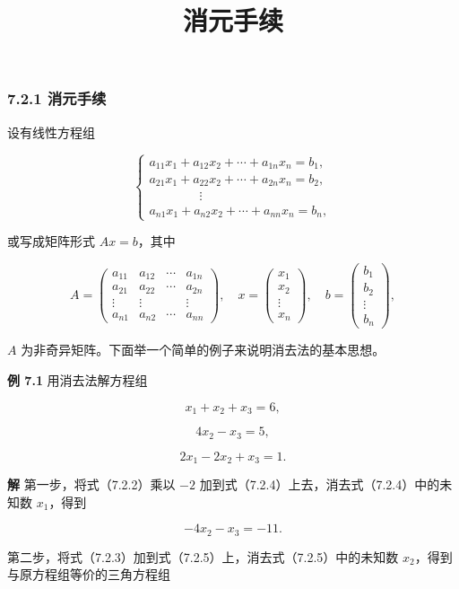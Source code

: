 \documentclass[
  10pt,
  fontset=fandol]{ctexart}
\title{消元手续}
\author{}
\date{}
\begin{document}
\maketitle

\subsubsection{7.2.1 消元手续}\label{ux6d88ux5143ux624bux7eed}

设有线性方程组

\[
\begin{cases}
a_{11}x_1+a_{12}x_2+\cdots+a_{1n}x_n=b_1,\\
a_{21}x_1+a_{22}x_2+\cdots+a_{2n}x_n=b_2,\\
\qquad\qquad\vdots\\
a_{n1}x_1+a_{n2}x_2+\cdots+a_{nn}x_n=b_n,
\end{cases}
\tag{7.2.1}
\]

或写成矩阵形式 \(Ax=b\)，其中

\[
A=\begin{pmatrix}
a_{11}&a_{12}&\cdots&a_{1n}\\
a_{21}&a_{22}&\cdots&a_{2n}\\
\vdots&\vdots&&\vdots\\
a_{n1}&a_{n2}&\cdots&a_{nn}
\end{pmatrix},\quad
x=\begin{pmatrix}x_1\\x_2\\\vdots\\x_n\end{pmatrix},\quad
b=\begin{pmatrix}b_1\\b_2\\\vdots\\b_n\end{pmatrix},
\]

\(A\) 为非奇异矩阵。下面举一个简单的例子来说明消去法的基本思想。

\textbf{例 7.1} 用消去法解方程组

\[x_1+x_2+x_3=6,\tag{7.2.2}\]

\[4x_2-x_3=5,\tag{7.2.3}\]

\[2x_1-2x_2+x_3=1.\tag{7.2.4}\]

\textbf{解} 第一步，将式（7.2.2）乘以 \(-2\) 加到式（7.2.4）上去，消去式（7.2.4）中的未知数 \(x_1\)，得到

\[-4x_2-x_3=-11.\tag{7.2.5}\]

第二步，将式（7.2.3）加到式（7.2.5）上，消去式（7.2.5）中的未知数 \(x_2\)，得到与原方程组等价的三角方程组
\end{document}
